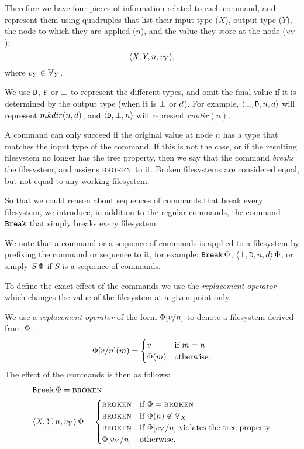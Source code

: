\begin{mydef}
Therefore we have four pieces of information related to each command,
and represent them using quadruples that list
their input type ($X$), output type ($Y$),
the node to which they are applied ($n$),
and the value they store at the node ($v_Y$):
\[ \langle{X,Y,n,v_Y}\rangle, \]
where $v_Y\in\mathbb{V}_{Y}$.

We use $\mathtt{D}$, $\mathtt{F}$ or $\bot$ to represent the different
types, and omit the final value if it is determined by the output type
(when it is $\bot$ or $d$).
For example, $\langle{\bot,\mathtt{D},n,d}\rangle$ will represent $mkdir(n,d)$,
and $\langle{\mathtt{D},\bot,n}\rangle$ will represent $rmdir(n)$.
\end{mydef}

\bigskip

\noindent
A command can only succeed if the original value at node $n$ has a type that matches
the input type of the command. If this is not the case, or if the resulting
filesystem no longer has the tree property, then we say that the command
{\em breaks} the filesystem, and assigns $\text{\normalfont\scshape{broken}}$ to it.
Broken filesystems are considered equal, but not equal to any working filesystem.

So that we could reason about sequences of commands that break every filesystem, 
we introduce, in addition to the regular commands,
the command $\mathtt{Break}$ that simply breaks every filesystem.

We note that a command or a sequence of commands is applied to a filesystem
by prefixing the command or sequence to it, for example: $\mathtt{Break}\,\Phi$, $\langle{\bot,\mathtt{D},n,d}\rangle\,\Phi$, 
or simply $S\,\Phi$ if $S$ is a sequence of commands.

To define the exact effect of the commands we use
the \emph{replacement operator}  which changes the
value of the filesystem at a given point only.

\begin{mydef}
We use a \emph{replacement operator} of the form
$\Phi[v/n]$ to denote a filesystem derived from $\Phi$:
\[ \Phi[v/n](m) =
   \begin{cases}
   v &\mbox{if~} m=n\\
   \Phi(m) &\mbox{otherwise.}
   \end{cases}
\]
The effect of the commands is then as follows:
\begin{align*}
&\mathtt{Break}\,\Phi = \text{\normalfont\scshape{broken}} \\
&\langle{X,Y,n,v_Y}\rangle\,\Phi = 
   \begin{cases}
   \text{\normalfont\scshape{broken}} &\mbox{if~} \Phi=\text{\normalfont\scshape{broken}}\\
   \text{\normalfont\scshape{broken}} &\mbox{if~} \Phi(n)\not\in\mathbb{V}_{X}\\
   \text{\normalfont\scshape{broken}} &\mbox{if~} \Phi[v_Y/n] \mbox{~violates the tree property}\\
   \Phi[v_Y/n] &\mbox{otherwise.}
   \end{cases}
\end{align*}
\end{mydef}

